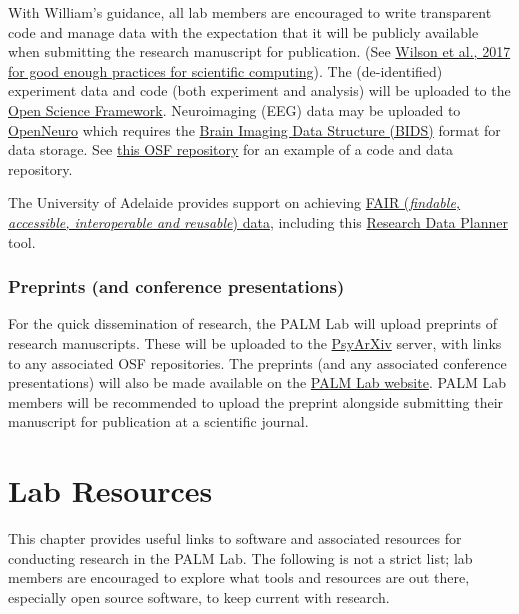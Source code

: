 \documentclass[
]{book}
\begin{document}
With William's guidance, all lab members are encouraged to write transparent code and manage data with the expectation that it will be publicly available when submitting the research manuscript for publication. (See \href{https://journals.plos.org/ploscompbiol/article?id=10.1371/journal.pcbi.1005510}{Wilson et al., 2017 for good enough practices for scientific computing}). The (de-identified) experiment data and code (both experiment and analysis) will be uploaded to the \href{https://osf.io}{Open Science Framework}. Neuroimaging (EEG) data may be uploaded to \href{https://openneuro.org/}{OpenNeuro} which requires the \href{https://bids.neuroimaging.io/}{Brain Imaging Data Structure (BIDS)} format for data storage. See \href{https://osf.io/wjr7u/}{this OSF repository} for an example of a code and data repository.

The University of Adelaide provides support on achieving \href{https://www.adelaide.edu.au/library/library-services/services-for-researchers/fair}{FAIR (\emph{findable, accessible, interoperable and reusable}) data}, including this \href{https://www.adelaide.edu.au/technology/research/research-data/research-data-planner}{Research Data Planner} tool.

\hypertarget{preprints-and-conference-presentations}{%
\subsection{Preprints (and conference presentations)}\label{preprints-and-conference-presentations}}

For the quick dissemination of research, the PALM Lab will upload preprints of research manuscripts. These will be uploaded to the \href{https://psyarxiv.com}{PsyArXiv} server, with links to any associated OSF repositories. The preprints (and any associated conference presentations) will also be made available on the \href{https://palm-lab.github.io/presentations}{PALM Lab website}. PALM Lab members will be recommended to upload the preprint alongside submitting their manuscript for publication at a scientific journal.

\hypertarget{lab-resources}{%
\chapter{Lab Resources}\label{lab-resources}}

This chapter provides useful links to software and associated resources for conducting research in the PALM Lab. The following is not a strict list; lab members are encouraged to explore what tools and resources are out there, especially open source software, to keep current with research.
\end{document}
